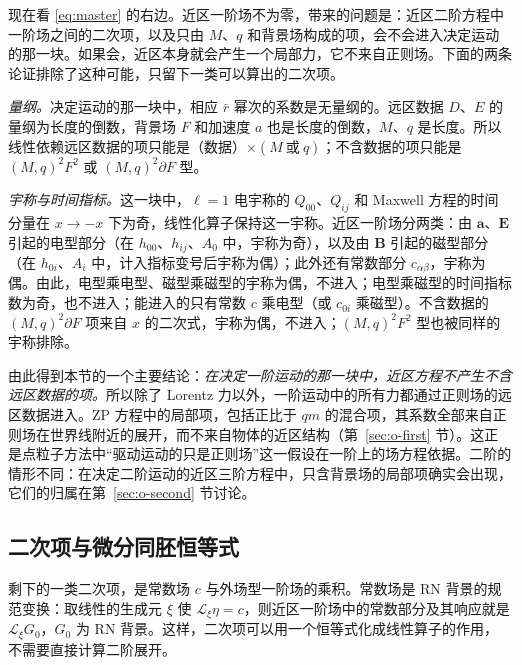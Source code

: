 \documentclass[11pt,a4paper]{ctexart}
\begin{document}
现在看 \eqref{eq:master} 的右边。近区一阶场不为零，带来的问题是：近区二阶方程中一阶场之间的二次项，以及只由 $M$、$q$ 和背景场构成的项，会不会进入决定运动的那一块。如果会，近区本身就会产生一个局部力，它不来自正则场。下面的两条论证排除了这种可能，只留下一类可以算出的二次项。

\emph{量纲。}决定运动的那一块中，相应 $\bar r$ 幂次的系数是无量纲的。远区数据 $D$、$E$ 的量纲为长度的倒数，背景场 $F$ 和加速度 $a$ 也是长度的倒数，$M$、$q$ 是长度。所以线性依赖远区数据的项只能是（数据）$\times(M\ \text{或}\ q)$；不含数据的项只能是 $(M,q)^2F^2$ 或 $(M,q)^2\partial F$ 型。

\emph{宇称与时间指标。}这一块中，$\ell=1$ 电宇称的 $Q_{00}$、$Q_{ij}$ 和 Maxwell 方程的时间分量在 $x\to-x$ 下为奇，线性化算子保持这一宇称。近区一阶场分两类：由 $\boldsymbol a$、$\boldsymbol E$ 引起的电型部分（在 $h_{00}$、$h_{ij}$、$A_0$ 中，宇称为奇），以及由 $\boldsymbol B$ 引起的磁型部分（在 $h_{0i}$、$A_i$ 中，计入指标变号后宇称为偶）；此外还有常数部分 $c_{\alpha\beta}$，宇称为偶。由此，电型乘电型、磁型乘磁型的宇称为偶，不进入；电型乘磁型的时间指标数为奇，也不进入；能进入的只有常数 $c$ 乘电型（或 $c_{0i}$ 乘磁型）。不含数据的 $(M,q)^2\partial F$ 项来自 $x$ 的二次式，宇称为偶，不进入；$(M,q)^2F^2$ 型也被同样的宇称排除。

由此得到本节的一个主要结论：\emph{在决定一阶运动的那一块中，近区方程不产生不含远区数据的项。}所以除了 Lorentz 力以外，一阶运动中的所有力都通过正则场的远区数据进入。ZP 方程中的局部项，包括正比于 $qm$ 的混合项，其系数全部来自正则场在世界线附近的展开，而不来自物体的近区结构（第~\ref{sec:o-first} 节）。这正是点粒子方法中“驱动运动的只是正则场”这一假设在一阶上的场方程依据。二阶的情形不同：在决定二阶运动的近区三阶方程中，只含背景场的局部项确实会出现，它们的归属在第~\ref{sec:o-second} 节讨论。

\subsection{二次项与微分同胚恒等式}\label{sec:struct-Q}

剩下的一类二次项，是常数场 $c$ 与外场型一阶场的乘积。常数场是 RN 背景的规范变换：取线性的生成元 $\xi$ 使 $\mathcal L_\xi\eta=c$，则近区一阶场中的常数部分及其响应就是 $\mathcal L_\xi G_0$，$G_0$ 为 RN 背景。这样，二次项可以用一个恒等式化成线性算子的作用，不需要直接计算二阶展开。
\end{document}
